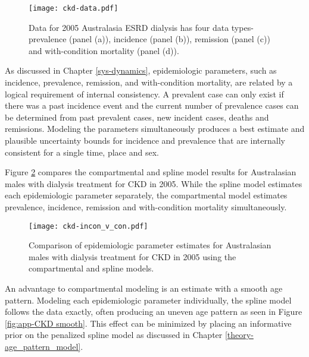     \begin{figure}[h]
        \begin{center}
            \texttt{[image: ckd-data.pdf]}
            \caption{Data for 2005 Australasia ESRD dialysis has four
              data types-prevalence (panel (a)), incidence (panel
              (b)), remission (panel (c)) and with-condition mortality
              (panel (d)).}
            \label{fig:app-CKD data}
        \end{center}
    \end{figure}

As discussed in Chapter \ref{sys-dynamics}, epidemiologic parameters,
such as incidence, prevalence, remission, and with-condition
mortality, are related by a logical requirement of internal
consistency.  A prevalent case can only exist if there was a past
incidence event and the current number of prevalence cases can be
determined from past prevalent cases, new incident cases, deaths and
remissions.  Modeling the parameters simultaneously produces a best
estimate and plausible uncertainty bounds for incidence and prevalence
that are internally consistent for a single time, place and sex.

Figure \ref{fig:app-CKD incon v con} compares the compartmental and
spline model results for Australasian males with dialysis
treatment for CKD in 2005.  While the spline model estimates each
epidemiologic parameter separately, the compartmental model estimates
prevalence, incidence, remission and with-condition mortality
simultaneously.  

    \begin{figure}[h]
        \begin{center}
            \texttt{[image: ckd-incon\_v\_con.pdf]}
            \caption{Comparison of epidemiologic parameter estimates
              for Australasian males with dialysis treatment for CKD
              in 2005 using the compartmental and spline
              models.}
            \label{fig:app-CKD incon v con}
        \end{center}
    \end{figure}

An advantage to compartmental modeling is an estimate with a smooth
age pattern. Modeling each epidemiologic parameter individually, the
spline model follows the data exactly, often producing an
uneven age pattern as seen in Figure \ref{fig:app-CKD smooth}.  This
effect can be minimized by placing an informative prior on the
penalized spline model as discussed in Chapter
\ref{theory-age_pattern_model}.

